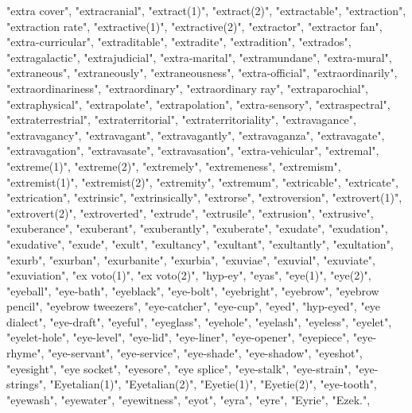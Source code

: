 "extra cover",
"extracranial",
"extract(1)",
"extract(2)",
"extractable",
"extraction",
"extraction rate",
"extractive(1)",
"extractive(2)",
"extractor",
"extractor fan",
"extra-curricular",
"extraditable",
"extradite",
"extradition",
"extrados",
"extragalactic",
"extrajudicial",
"extra-marital",
"extramundane",
"extra-mural",
"extraneous",
"extraneously",
"extraneousness",
"extra-official",
"extraordinarily",
"extraordinariness",
"extraordinary",
"extraordinary ray",
"extraparochial",
"extraphysical",
"extrapolate",
"extrapolation",
"extra-sensory",
"extraspectral",
"extraterrestrial",
"extraterritorial",
"extraterritoriality",
"extravagance",
"extravagancy",
"extravagant",
"extravagantly",
"extravaganza",
"extravagate",
"extravagation",
"extravasate",
"extravasation",
"extra-vehicular",
"extremal",
"extreme(1)",
"extreme(2)",
"extremely",
"extremeness",
"extremism",
"extremist(1)",
"extremist(2)",
"extremity",
"extremum",
"extricable",
"extricate",
"extrication",
"extrinsic",
"extrinsically",
"extrorse",
"extroversion",
"extrovert(1)",
"extrovert(2)",
"extroverted",
"extrude",
"extrusile",
"extrusion",
"extrusive",
"exuberance",
"exuberant",
"exuberantly",
"exuberate",
"exudate",
"exudation",
"exudative",
"exude",
"exult",
"exultancy",
"exultant",
"exultantly",
"exultation",
"exurb",
"exurban",
"exurbanite",
"exurbia",
"exuviae",
"exuvial",
"exuviate",
"exuviation",
"ex voto(1)",
"ex voto(2)",
"hyp-ey",
"eyas",
"eye(1)",
"eye(2)",
"eyeball",
"eye-bath",
"eyeblack",
"eye-bolt",
"eyebright",
"eyebrow",
"eyebrow pencil",
"eyebrow tweezers",
"eye-catcher",
"eye-cup",
"eyed",
"hyp-eyed",
"eye dialect",
"eye-draft",
"eyeful",
"eyeglass",
"eyehole",
"eyelash",
"eyeless",
"eyelet",
"eyelet-hole",
"eye-level",
"eye-lid",
"eye-liner",
"eye-opener",
"eyepiece",
"eye-rhyme",
"eye-servant",
"eye-service",
"eye-shade",
"eye-shadow",
"eyeshot",
"eyesight",
"eye socket",
"eyesore",
"eye splice",
"eye-stalk",
"eye-strain",
"eye-strings",
"Eyetalian(1)",
"Eyetalian(2)",
"Eyetie(1)",
"Eyetie(2)",
"eye-tooth",
"eyewash",
"eyewater",
"eyewitness",
"eyot",
"eyra",
"eyre",
"Eyrie",
"Ezek.",
